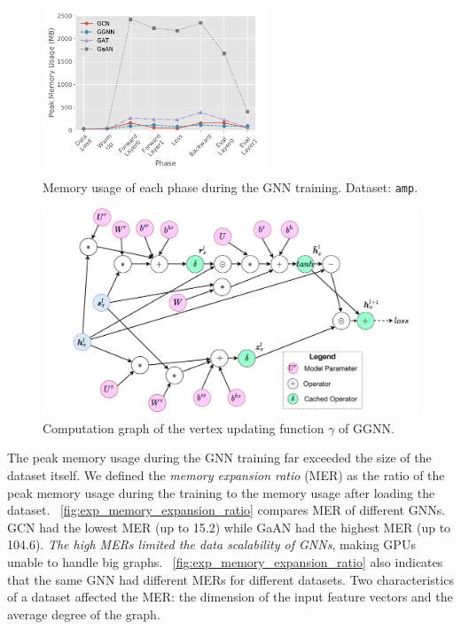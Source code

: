 \begin{figure}[H]
    \centering
    \includegraphics[height=5cm]{figs/experiments/exp_memory_usage_stage_amp.pdf}
    \caption{Memory usage of each phase during the GNN training. Dataset: \texttt{amp}.}
    \label{fig:exp_memory_usage_stage_amp}
\end{figure}

\begin{figure}[H]
    \centering
    \includegraphics[width=0.7\columnwidth]{figs/illustration/ggnn_vertex_func_computation_graph.pdf}
    \caption{Computation graph of the vertex updating function $\gamma$ of GGNN.}
    \label{fig:ggnn_vertex_func_computation_graph}
\end{figure}

The peak memory usage during the GNN training far exceeded the size of the dataset itself.
%
We defined the \emph{memory expansion ratio} (MER) as the ratio of the peak memory usage during the training to the memory usage after loading the dataset.
%
\figurename~\ref{fig:exp_memory_expansion_ratio} compares MER of different GNNs.
%
GCN had the lowest MER (up to 15.2) while GaAN had the highest MER (up to 104.6).
%
\emph{The high MERs limited the data scalability of GNNs}, making GPUs unable to handle big graphs.
%
\figurename~\ref{fig:exp_memory_expansion_ratio} also indicates that the same GNN had different MERs for different datasets.
%
Two characteristics of a dataset affected the MER: the dimension of the input feature vectors and the average degree of the graph.

